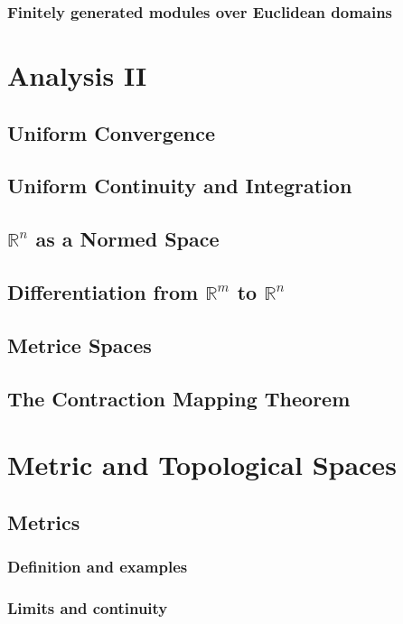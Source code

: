 \documentclass[12pt]{book}
\newcommand{\RR}{\mathbb R}
\theoremstyle{definition}
\theoremstyle{remark}
\begin{document}
			\subsection{Finitely generated modules over Euclidean domains}
	\chapter{Analysis II}
		\section{Uniform Convergence}
		
		\section{Uniform Continuity and Integration}
		
		\section{$\RR^n$ as a Normed Space}
		
		\section{Differentiation from $\RR^m$ to $\RR^n$}
		
		\section{Metrice Spaces}
		
		\section{The Contraction Mapping Theorem}
		
	\chapter{Metric and Topological Spaces}
		\section{Metrics}
			\subsection{Definition and examples}
			
			\subsection{Limits and continuity}
			
\end{document}
